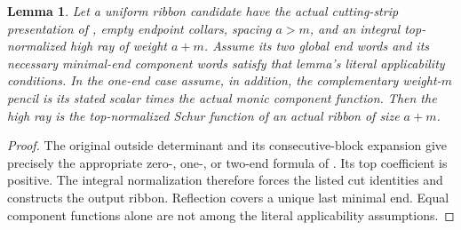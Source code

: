 \documentclass[11pt,a4paper]{amsart}
\numberwithin{equation}{section}
\theoremstyle{plain}
\newtheorem{lemma}[theorem]{Lemma}
\theoremstyle{definition}
\begin{document}
\begin{lemma}\label{lem:ribbon-end-recognition}
Let a uniform ribbon candidate have the actual cutting-strip presentation of , empty endpoint collars, spacing \(a>m\), and an integral top-normalized high ray of weight \(a+m\).  Assume its two global end words and its necessary minimal-end component words satisfy that lemma's literal applicability conditions.  In the one-end case assume, in addition, the complementary weight-\(m\) pencil is its stated scalar times the actual monic component function.  Then the high ray is the top-normalized Schur function of an actual ribbon of size \(a+m\).
\end{lemma}
\begin{proof}
The original outside determinant and its consecutive-block expansion give precisely the appropriate zero-, one-, or two-end formula of .  Its top coefficient is positive.  The integral normalization therefore forces the listed cut identities and constructs the output ribbon.  Reflection covers a unique last minimal end.  Equal component functions alone are not among the literal applicability assumptions.
\end{proof}
\end{document}
